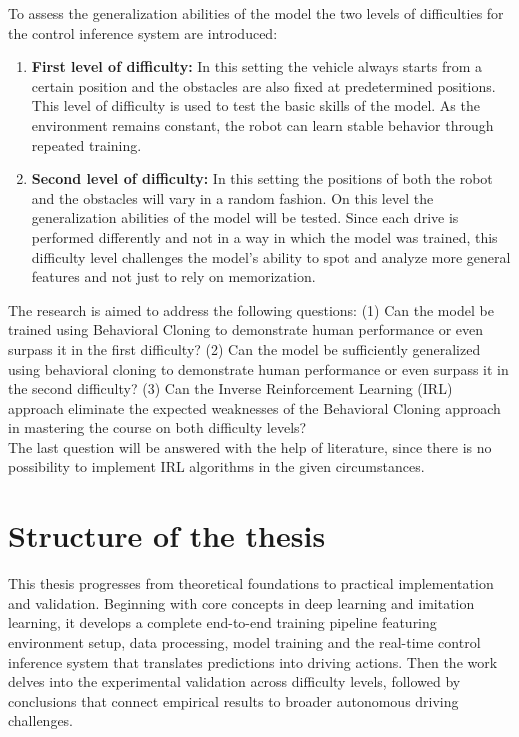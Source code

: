 To assess the generalization abilities of the model the two levels of difficulties for the control inference system are introduced:
\begin{enumerate}
  \item \textbf{First level of difficulty:} In this setting the vehicle always starts from a certain position and the obstacles are also fixed at predetermined positions. This level of difficulty is used to test the basic skills of the model. As the environment remains constant, the robot can learn stable behavior through repeated training.
  \item \textbf{Second level of difficulty:} In this setting the positions of both the robot and the obstacles will vary in a random fashion. On this level the generalization abilities of the model will be tested. Since each drive is performed differently and not in a way in which the model was trained, this difficulty level challenges the model's ability to spot and analyze more general features and not just to rely on memorization.
\end{enumerate}

The research is aimed to address the following questions: (1) Can the model be trained using Behavioral Cloning \autocite{5152385} to demonstrate human performance or even surpass it in the first difficulty? (2) Can the model be sufficiently generalized using behavioral cloning to demonstrate human performance or even surpass it in the second difficulty? (3) Can the Inverse Reinforcement Learning (IRL) \autocite{ng2000algorithms} \autocite{neu2012apprenticeshiplearningusinginverse} \autocites{lee2021approximateinversereinforcementlearning} approach eliminate the expected weaknesses of the Behavioral Cloning approach in mastering the course on both difficulty levels? \\
The last question will be answered with the help of literature, since there is no possibility to implement IRL algorithms in the given circumstances.

\section{Structure of the thesis}

This thesis progresses from theoretical foundations to practical implementation and validation. Beginning with core concepts in deep learning and imitation learning, it develops a complete end-to-end training pipeline featuring environment setup, data processing, model training and the real-time control inference system that translates predictions into driving actions. Then the work delves into the experimental validation across difficulty levels, followed by conclusions that connect empirical results to broader autonomous driving challenges.